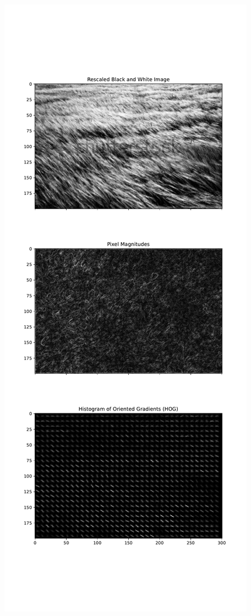 \documentclass[
  letterpaper,
  DIV=11,
  numbers=noendperiod]{scrreprt}
\begin{document}
\begin{figure}[H]

{\centering \includegraphics{results_files/figure-pdf/unnamed-chunk-32-2.pdf}

}

\end{figure}
\end{document}

